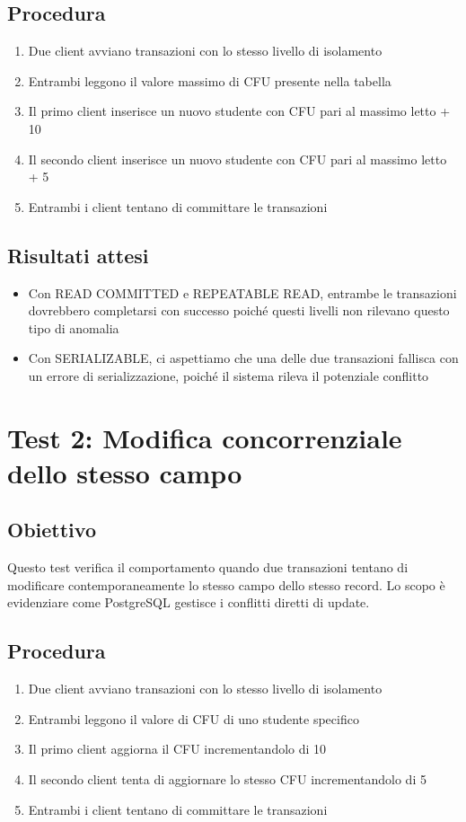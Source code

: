 \documentclass[a4paper,12pt]{report}
\begin{document}
\subsection{Procedura}
\begin{enumerate}
    \item Due client avviano transazioni con lo stesso livello di isolamento
    \item Entrambi leggono il valore massimo di CFU presente nella tabella
    \item Il primo client inserisce un nuovo studente con CFU pari al massimo letto + 10
    \item Il secondo client inserisce un nuovo studente con CFU pari al massimo letto + 5
    \item Entrambi i client tentano di committare le transazioni
\end{enumerate}

\subsection{Risultati attesi}
\begin{itemize}
    \item Con READ COMMITTED e REPEATABLE READ, entrambe le transazioni dovrebbero completarsi con successo poiché questi livelli non rilevano questo tipo di anomalia
    \item Con SERIALIZABLE, ci aspettiamo che una delle due transazioni fallisca con un errore di serializzazione, poiché il sistema rileva il potenziale conflitto
\end{itemize}

\section{Test 2: Modifica concorrenziale dello stesso campo}
\subsection{Obiettivo}
Questo test verifica il comportamento quando due transazioni tentano di modificare contemporaneamente lo stesso campo dello stesso record. Lo scopo è evidenziare come PostgreSQL gestisce i conflitti diretti di update.

\subsection{Procedura}
\begin{enumerate}
    \item Due client avviano transazioni con lo stesso livello di isolamento
    \item Entrambi leggono il valore di CFU di uno studente specifico
    \item Il primo client aggiorna il CFU incrementandolo di 10
    \item Il secondo client tenta di aggiornare lo stesso CFU incrementandolo di 5
    \item Entrambi i client tentano di committare le transazioni
\end{enumerate}
\end{document}
